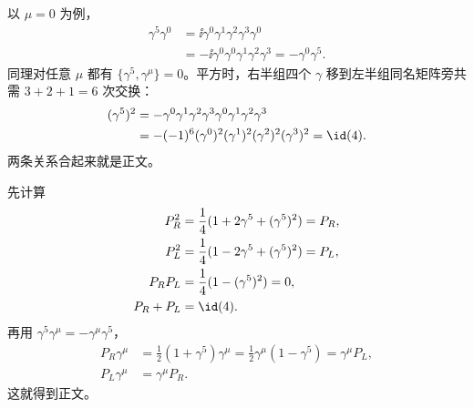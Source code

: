 \begin{derivation}
以 $\mu=0$ 为例，
\begin{align*}
 \gamma^5\gamma^0
 &=\ii\gamma^0\gamma^1\gamma^2\gamma^3\gamma^0\\
 &=-\ii\gamma^0\gamma^0\gamma^1\gamma^2\gamma^3
 =-\gamma^0\gamma^5.
\end{align*}
同理对任意 $\mu$ 都有 $\{\gamma^5,\gamma^\mu\}=0$。平方时，右半组四个 $\gamma$ 移到左半组同名矩阵旁共需 $3+2+1=6$ 次交换：
\begin{align*}
 (\gamma^5)^2
 &=-\gamma^0\gamma^1\gamma^2\gamma^3
 \gamma^0\gamma^1\gamma^2\gamma^3\\
 &=-(-1)^6(\gamma^0)^2(\gamma^1)^2(\gamma^2)^2(\gamma^3)^2
 =\id(4).
\end{align*}
两条关系合起来就是正文。

先计算
\begin{align*}
 P_R^2&=\frac14(1+2\gamma^5+(\gamma^5)^2)=P_R,\\
 P_L^2&=\frac14(1-2\gamma^5+(\gamma^5)^2)=P_L,\\
 P_RP_L&=\frac14(1-(\gamma^5)^2)=0,\\
 P_R+P_L&=\id(4).
\end{align*}
再用 $\gamma^5\gamma^\mu=-\gamma^\mu\gamma^5$，
\begin{align*}
 P_R\gamma^\mu
 &=\frac12(1+\gamma^5)\gamma^\mu
 =\frac12\gamma^\mu(1-\gamma^5)
 =\gamma^\mu P_L,\\
 P_L\gamma^\mu&=\gamma^\mu P_R.
\end{align*}
这就得到正文。
\end{derivation}
